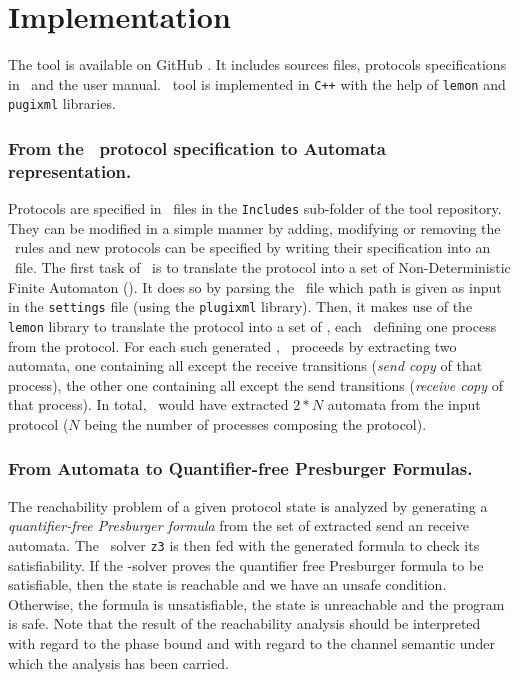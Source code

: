 \section{Implementation}
\label{sec:optim}

The tool is available on GitHub \cite{github.MPass}.
It includes sources files, protocols specifications in \Xml\ and the user manual.
%
\MPass\ tool is implemented in \texttt{C++} with the help of \texttt{lemon} and \texttt{pugixml} libraries.
%

\subsubsection*{From the \Xml\ protocol specification to Automata representation.}
\label{subsec:copies}
Protocols are specified in \Xml\ files in the \texttt{Includes} sub-folder of the tool repository.
%
They can be modified in a simple manner by adding, modifying or removing the \Xml\ rules and
new protocols can be specified by writing their specification into an \Xml\ file.
%
The first task of \MPass\ is to translate the protocol into a set of Non-Deterministic Finite Automaton (\Nfa).
%
It does so by parsing the \Xml\ file which path is given as input in the \texttt{settings} file (using the \texttt{plugixml} library).
%
Then, it makes use of the \texttt{lemon} library to translate the protocol into a set of \Nfa,
each \Nfa\ defining one process from the protocol.
%
For each such generated \Nfa, \MPass\ proceeds by extracting two automata,
one containing all except the receive transitions (\textit{send copy} of that process),
the other one containing all except the send transitions (\textit{receive copy} of that process).
%
In total, \MPass\ would have extracted $2*N$ automata from the input protocol
($N$ being the number of processes composing the protocol).

\subsubsection*{From Automata to Quantifier-free Presburger Formulas.}
The reachability problem of a given protocol state is analyzed by generating a \emph{quantifier-free Presburger formula}
from the set of extracted send an receive automata.
%
The \Smt\ solver \texttt{z3} is then fed with the generated formula to check its satisfiability.
%
If the \Smt-solver proves the quantifier free Presburger formula to be satisfiable,
then the state is reachable and we have an unsafe condition.
Otherwise, the formula is unsatisfiable, the state is unreachable and the program is safe.
%
Note that the result of the reachability analysis should be interpreted with regard to the phase bound and with regard to the channel semantic
under which the analysis has been carried.

